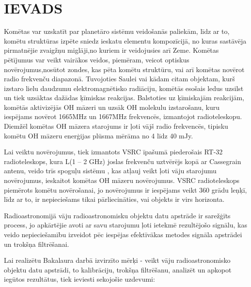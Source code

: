 \chapter*{IEVADS}

Komētas var uzskatīt par planetāro sistēmu veidošanās paliekām, līdz ar to, komētu struktūras izpēte sniedz ieskatu elementu kompozīcijā, no kuras sastāvēja pirmatnējie zvaigžņu miglāji,no kuriem ir veidojusies arī Zeme. Komētas pētījumus var veikt vairākos veidos, piemēram, veicot optiskus novērojumus,nosūtot zondes, kas pēta komētu struktūru, vai arī komētas novērot radio frekvenču diapazonā. Tuvojoties Saulei vai kādam citam objektam, kurš izstaro lielu daudzumu elektromagnētisko radiāciju, komētās esošais ledus uzsilst un tiek uzsāktas dažādas ķīmiskas reakcijas. Balstoties uz ķīmiskajām reakcijām, komētās aktivizējās OH māzeri un uzsāk OH molekulu izstarošanu, kuru iespējams novērot 1665MHz un 1667MHz frekvencēs, izmantojot radioteleskopu. Diemžēl komētas OH māzera starojums ir ļoti vājš radio frekvencēs, tipisku komētu OH māzeru enerģijas plūsma mērāma no 4 līdz 40 mJy.

Lai veiktu novērojumus, tiek izmantots VSRC īpašumā piederošais RT-32 radioteleskops, kura L(1 – 2 GHz) joslas frekvenču uztvērējs kopā ar Cassegrain antenu, veido trīs spoguļu sistēmu \cite{telescope-sefd}, kas atļauj veikt ļoti vāju starojumu novērojumus, ieskaitot komētas OH māzeru novērojumus. VSRC radioteleskops piemērots komētu novērošanai, jo novērojumus ir iespējams veikt 360 grādu leņķī, līdz ar to, ir nepieciešams tikai pārliecināties, vai objekts ir virs horizonta.

Radioastronomijā vāju radioastronomisku objektu datu apstrāde ir sarežģīts process, jo apkārtējie avoti ar savu starojumu ļoti ietekmē rezultējošo signālu, kas veido nepieciešamību izveidot pēc iespējas efektīvākas metodes signāla apstrādei un trokšņa filtrēšanai. 

Lai realizētu Bakalaura darbā izvirzīto mērķi - veikt vāju radioastronomisko objektu datu apstrādi, to kalibrāciju, trokšņa filtrēšanu, analizēt un apkopot iegūtos rezultātus, tiek ieviesti sekojošie uzdevumi:

